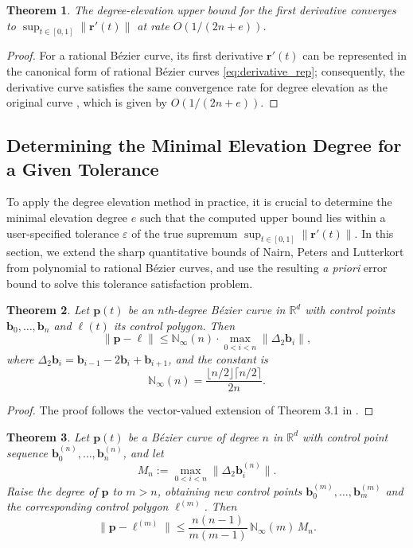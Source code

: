 \documentclass[preprint,12pt]{elsarticle}
\newcommand{\norm}[1]{\left\lVert #1 \right\rVert}
\newtheorem{Theorem}{Theorem}
\begin{document}
\begin{Theorem}
The degree-elevation upper bound for the first derivative converges to \(\sup_{t\in[0,1]}\norm{\mathbf r'(t)}\) at rate \(O\!\left(1/(2n+e)\right)\). 
\end{Theorem}
\begin{proof}
For a rational Bézier curve, its first derivative $\mathbf{r}'(t)$ can be represented in the canonical form of rational Bézier curves \eqref{eq:derivative_rep}; consequently, the derivative curve satisfies the same convergence rate for degree elevation as the original curve \cite{prautzsch1994}, which is given by $O(1/(2n+e))$.
\end{proof}

\subsection{Determining the Minimal Elevation Degree for a Given Tolerance}


To apply the degree elevation method in practice, it is crucial to determine the minimal elevation degree $e$ such that the computed upper bound lies within a user-specified tolerance $\varepsilon$ of the true supremum $\sup_{t\in[0,1]}\norm{\mathbf{r}'(t)}$. In this section, we extend the sharp quantitative bounds of Nairn, Peters and Lutterkort \cite{Nairn1999} from polynomial to rational Bézier curves, and use the resulting \emph{a priori} error bound to solve this tolerance satisfaction problem.

\begin{Theorem} \label{Vec3.1}
  Let $\mathbf{p}(t)$ be an $n$th-degree B\'ezier curve in $\mathbb{R}^d$ with control points \(\mathbf b_0,\dots,\mathbf b_n\) and $\bm{\ell}(t)$ its control polygon. Then
  \[
  \|\mathbf{p}-\bm{\ell}\| \le \mathbb{N}_{\infty}(n) \cdot \max_{0<i<n} \|\Delta_2\mathbf{b}_i\|,
  \]
  where $\Delta_2\mathbf{b}_i = \mathbf{b}_{i-1}-2\mathbf{b}_i+\mathbf{b}_{i+1}$, and the constant is
  \[
  \mathbb{N}_{\infty}(n)=\frac{\lfloor n/2\rfloor\lceil n/2\rceil}{2n}.
  \]
  \end{Theorem}
\begin{proof}
 The proof follows the vector-valued extension of Theorem 3.1 in \cite{Nairn1999}.
\end{proof}
\begin{Theorem} \label{Vec7.1}
  Let $\mathbf{p}(t)$ be a B\'ezier curve of degree $n$ in $\mathbb{R}^d$ with control point sequence $\mathbf{b}^{(n)}_0,\dots,\mathbf{b}^{(n)}_n$, and let
  \[
  M_n:=\max_{0<i<n}\|\Delta_2\mathbf{b}^{(n)}_i\|.
  \]
  Raise the degree of $\mathbf{p}$ to $m>n$, obtaining new control points $\mathbf{b}^{(m)}_0,\dots,\mathbf{b}^{(m)}_m$ and the corresponding control polygon $\bm{\ell}^{(m)}$. Then
  \[
  \|\mathbf{p}-\bm{\ell}^{(m)}\|\le \frac{n(n-1)}{m(m-1)}\,\mathbb{N}_{\infty}(m)\,M_n.
  \]
\end{Theorem}
\end{document}
